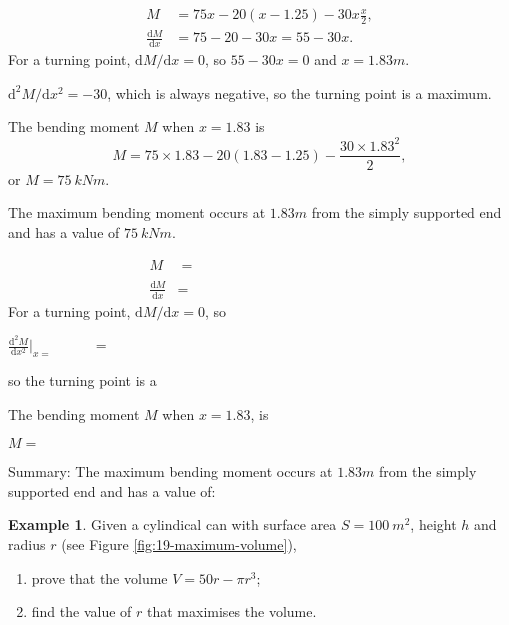 \documentclass[
  11pt,
  oneside]{book}
\providecommand{\tightlist}{%
  \setlength{\itemsep}{0pt}\setlength{\parskip}{0pt}}
\newcommand{\slide}{}
\theoremstyle{definition}
\theoremstyle{definition}
\newtheorem{example}{Example}[chapter]
\theoremstyle{definition}
\theoremstyle{definition}
\theoremstyle{remark}
\begin{document}
\begin{notslides}

\begin{align*}
M &= 75x - 20(x-1.25) - 30x\frac{x}{2},\\
\frac{\mathrm{d}M}{\mathrm{d} x} &= 75-20-30x = 55 - 30x.
\end{align*}
For a turning point, \(\mathrm{d}M/\mathrm{d}x=0\), so \(55 - 30x = 0\) and \(x = 1.83 m\).

\(\mathrm{d}^2M/\mathrm{d}x^2 = -30\), which is always negative, so the turning point is a maximum.

The bending moment \(M\) when \(x = 1.83\) is
\[
M = 75\times1.83 - 20(1.83 - 1.25) - \frac{30\times1.83^2}{2},
\]
or \(M = 75\ kNm\).

The maximum bending moment occurs at \(1.83 m\) from the simply supported end and has a value of \(75\ kNm\).

\end{notslides}

\begin{slidesonly}

\begin{align*}
M &= \phantom{75x - 20(x-1.25) - 30x\frac{x}{2}}\\
\frac{\mathrm{d}M}{\mathrm{d} x} &= 
\end{align*}
For a turning point, \(\mathrm{d}M/\mathrm{d}x=0\), so

\vfill

\(\frac{\mathrm{d}^2M}{\mathrm{d}x^2}\Big|_{x=\phantom{asdfasdf}} =\)

so the turning point is a

\slide

The bending moment \(M\) when \(x = 1.83\), is

\(M=\)

\vfill

Summary: The maximum bending moment occurs at \(1.83m\) from the simply supported end and has a value of:
\slide

\end{slidesonly}

\begin{example}

Given a cylindical can with surface area \(S=100\ m^2\), height \(h\) and radius \(r\) (see Figure \ref{fig:19-maximum-volume}),

\begin{enumerate}
\def\labelenumi{\arabic{enumi}.}
\tightlist
\item
  prove that the volume \(V = 50r-\pi r^3\);
\item
  find the value of \(r\) that maximises the volume.
\end{enumerate}

\end{example}
\end{document}
